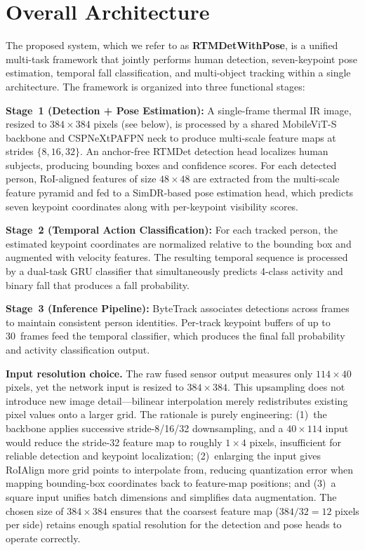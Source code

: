 
\section{Overall Architecture}
\label{sec:overall}

The proposed system, which we refer to as \textbf{RTMDetWithPose}, is a unified multi-task framework that jointly performs human detection, seven-keypoint pose estimation, temporal fall classification, and multi-object tracking within a single architecture. The framework is organized into three functional stages:

\textbf{Stage~1 (Detection + Pose Estimation):} A single-frame thermal IR image, resized to $384 \times 384$ pixels (see below), is processed by a shared MobileViT-S backbone and CSPNeXtPAFPN neck to produce multi-scale feature maps at strides $\{8, 16, 32\}$. An anchor-free RTMDet detection head localizes human subjects, producing bounding boxes and confidence scores. For each detected person, RoI-aligned features of size $48 \times 48$ are extracted from the multi-scale feature pyramid and fed to a SimDR-based pose estimation head, which predicts seven keypoint coordinates along with per-keypoint visibility scores.

\textbf{Stage~2 (Temporal Action Classification):} For each tracked person, the estimated keypoint coordinates are normalized relative to the bounding box and augmented with velocity features. The resulting temporal sequence is processed by a dual-task GRU classifier that simultaneously predicts 4-class activity and binary fall that produces a fall probability.

\textbf{Stage~3 (Inference Pipeline):} ByteTrack associates detections across frames to maintain consistent person identities. Per-track keypoint buffers of up to 30~frames feed the temporal classifier, which produces the final fall probability and activity classification output.

\textbf{Input resolution choice.}
The raw fused sensor output measures only $114 \times 40$ pixels, yet the network input is resized to $384 \times 384$. This upsampling does not introduce new image detail---bilinear interpolation merely redistributes existing pixel values onto a larger grid. The rationale is purely engineering: (1)~the backbone applies successive stride-8/16/32 downsampling, and a $40 \times 114$ input would reduce the stride-32 feature map to roughly $1 \times 4$ pixels, insufficient for reliable detection and keypoint localization; (2)~enlarging the input gives RoIAlign more grid points to interpolate from, reducing quantization error when mapping bounding-box coordinates back to feature-map positions; and (3)~a square input unifies batch dimensions and simplifies data augmentation. The chosen size of $384 \times 384$ ensures that the coarsest feature map ($384/32 = 12$ pixels per side) retains enough spatial resolution for the detection and pose heads to operate correctly.

